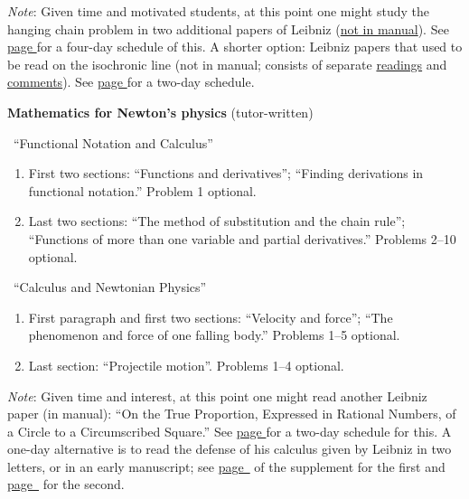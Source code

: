 \documentclass[10pt]{article}
\begin{document}
{{\small \emph{Note}: Given
       time and motivated students, at this point one might
       study the hanging
	chain problem in two additional papers of Leibniz
	(\href{https://drive.google.com/file/d/1Q06ypQH26GPMVsxn8SRQVEEn79qmUxOE/view?usp=sharing}{not in manual}).
	See \hyperref[LeibnizHang]{page
		\pageref{LeibnizHang}} for a four-day
	schedule of this.} A shorter option: Leibniz papers that used to be read on the isochronic line (not in manual; consists of separate \href{https://drive.google.com/file/d/13w3nTIpDN1F0sgImLWWRaLF5vg2cF6BL/view?usp=sharing}{readings} and \href{https://drive.google.com/file/d/140fF6SF7omRfQ-sFkhHiBlaNOiBiNvUq/view?usp=sharing}{comments}). See \hyperref[LeibnizIso]{page \pageref{LeibnizIso}} for a two-day schedule.

	\textbf{Mathematics for Newton's physics}
	(tutor-written)
	\vspace{-0.3em}

\ ``Functional Notation and
	Calculus''
	\vspace{-0.3em}
	

\begin{enumerate}[resume*]
	\item First two sections: ``Functions and
		derivatives''; ``Finding derivations in functional
		notation.'' Problem 1 optional. 
	\item Last two sections: ``The method of
		substitution and the chain rule'';
		``Functions of more than one variable and
		partial derivatives.'' Problems 2--10 optional. 
\end{enumerate}

\vspace{-0.3em}
\ ``Calculus and Newtonian Physics''
\begin{enumerate}[resume*]
	\item First paragraph and first two sections:
		``Velocity and force''; ``The phenomenon and
		force of one falling body.'' Problems 1--5
		optional.
	\item Last section: ``Projectile motion''. Problems
		1--4 optional.
\end{enumerate}
{\small \emph{Note}: Given time and interest, at this point one
might read another Leibniz paper (in manual): 
	``On the True Proportion, Expressed
	in Rational Numbers, of a Circle to a Circumscribed
	Square.'' See \hyperref[LeibnizProp]{page
		\pageref{LeibnizProp}} for a
	two-day schedule for this. A one-day alternative is
	to read the defense of his calculus given by Leibniz
	in two letters, or in an early manuscript; see
	\hyperref[supple.46]{page~\pageref{supple.46}} of
	the
supplement for the first and
\hyperref[supple.51]{page~\pageref{supple.51}} for the
second.}

}
\end{document}
